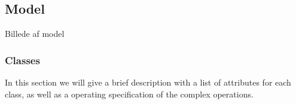 \subsection{Model}

Billede af model


\subsubsection{Classes}
In this section we will give a brief description with a list of attributes for each class, as well as a operating specification of the complex operations.